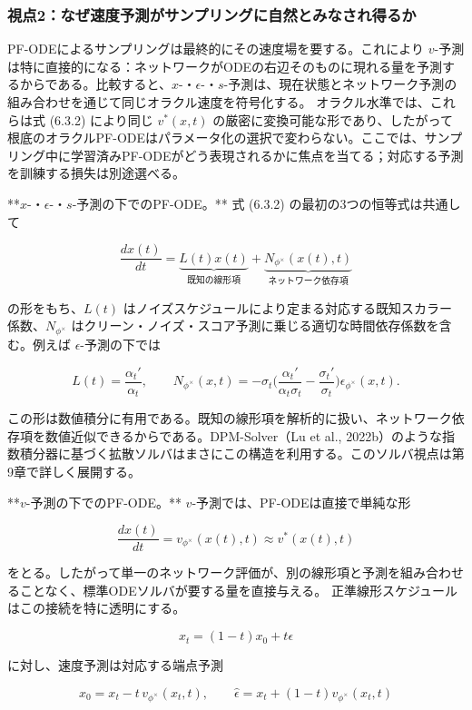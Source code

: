 \subsubsection*{視点2：なぜ速度予測がサンプリングに自然とみなされ得るか}


PF-ODEによるサンプリングは最終的にその速度場を要する。これにより $v$-予測は特に直接的になる：ネットワークがODEの右辺そのものに現れる量を予測するからである。比較すると、$x$-・$\epsilon$-・$s$-予測は、現在状態とネットワーク予測の組み合わせを通じて同じオラクル速度を符号化する。
オラクル水準では、これらは式 (6.3.2) により同じ $v^*(x,t)$ の厳密に変換可能な形であり、したがって根底のオラクルPF-ODEはパラメータ化の選択で変わらない。ここでは、サンプリング中に学習済みPF-ODEがどう表現されるかに焦点を当てる；対応する予測を訓練する損失は別途選べる。

**$x$-・$\epsilon$-・$s$-予測の下でのPF-ODE。** 式 (6.3.2) の最初の3つの恒等式は共通して

\[
\frac{dx(t)}{dt}=\underbrace{L(t)x(t)}_{\text{既知の線形項}}+\underbrace{N_{\phi^\times}(x(t),t)}_{\text{ネットワーク依存項}}
\]


の形をもち、$L(t)$ はノイズスケジュールにより定まる対応する既知スカラー係数、$N_{\phi^\times}$ はクリーン・ノイズ・スコア予測に乗じる適切な時間依存係数を含む。例えば $\epsilon$-予測の下では

\[
L(t)=\frac{\alpha_t'}{\alpha_t},\qquad
N_{\phi^\times}(x,t)=-\sigma_t\Biggl(\frac{\alpha_t'}{\alpha_t\sigma_t}-\frac{\sigma_t'}{\sigma_t}\Biggr)\epsilon_{\phi^\times}(x,t).
\]


この形は数値積分に有用である。既知の線形項を解析的に扱い、ネットワーク依存項を数値近似できるからである。DPM-Solver（Lu et al., 2022b）のような指数積分器に基づく拡散ソルバはまさにこの構造を利用する。このソルバ視点は第9章で詳しく展開する。

**$v$-予測の下でのPF-ODE。** $v$-予測では、PF-ODEは直接で単純な形

\[
\frac{dx(t)}{dt}=v_{\phi^\times}(x(t),t)\approx v^*(x(t),t)
\]


をとる。したがって単一のネットワーク評価が、別の線形項と予測を組み合わせることなく、標準ODEソルバが要する量を直接与える。
正準線形スケジュールはこの接続を特に透明にする。

\[
x_t=(1-t)x_0+t\epsilon
\]


に対し、速度予測は対応する端点予測

\[
\hat{x}_0=x_t-t\,v_{\phi^\times}(x_t,t),\qquad
\hat{\epsilon}=x_t+(1-t)v_{\phi^\times}(x_t,t)
\]


